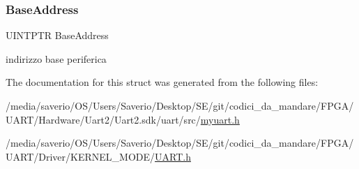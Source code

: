 \subsubsection{\texorpdfstring{Base\+Address}{BaseAddress}}
{\footnotesize\ttfamily U\+I\+N\+T\+P\+TR Base\+Address}

indirizzo base periferica 

The documentation for this struct was generated from the following files\+:\begin{DoxyCompactItemize}
\item 
/media/saverio/\+O\+S/\+Users/\+Saverio/\+Desktop/\+S\+E/git/codici\+\_\+da\+\_\+mandare/\+F\+P\+G\+A/\+U\+A\+R\+T/\+Hardware/\+Uart2/\+Uart2.\+sdk/uart/src/\hyperlink{myuart_8h}{myuart.\+h}\item 
/media/saverio/\+O\+S/\+Users/\+Saverio/\+Desktop/\+S\+E/git/codici\+\_\+da\+\_\+mandare/\+F\+P\+G\+A/\+U\+A\+R\+T/\+Driver/\+K\+E\+R\+N\+E\+L\+\_\+\+M\+O\+D\+E/\hyperlink{UART_8h}{U\+A\+R\+T.\+h}\end{DoxyCompactItemize}
